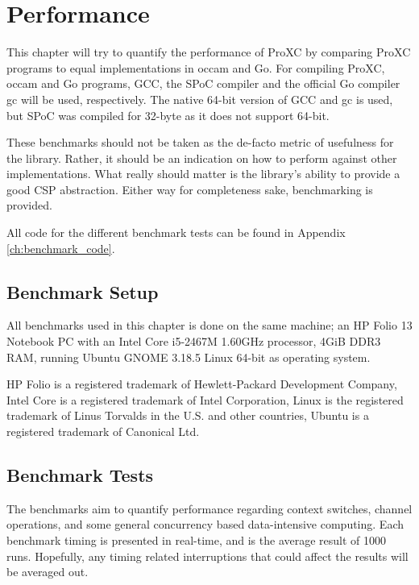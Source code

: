 
\chapter{Performance}
\label{ch:performance}

This chapter will try to quantify the performance of ProXC by comparing ProXC programs to equal implementations in occam and Go. For compiling ProXC, occam and Go programs, GCC, the SPoC compiler and the official Go compiler gc will be used, respectively. The native 64\hyp{}bit version of GCC and gc is used, but SPoC was compiled for 32\hyp{}byte as it does not support 64\hyp{}bit. 

These benchmarks should not be taken as the de\hyp{}facto metric of usefulness for the library. Rather, it should be an indication on how to perform against other implementations. What really should matter is the library's ability to provide a good CSP abstraction. Either way for completeness sake, benchmarking is provided. 

All code for the different benchmark tests can be found in Appendix \ref{ch:benchmark_code}. 

\section{Benchmark Setup}

All benchmarks used in this chapter is done on the same machine; an HP\textregistered{} Folio 13 Notebook PC with an Intel\textregistered{} Core\texttrademark{} i5-2467M 1.60GHz processor, 4GiB DDR3 RAM, running Ubuntu GNOME 3.18.5 Linux\textregistered{} 64-bit as operating system.

HP Folio is a registered trademark of Hewlett\hyp{}Packard Development Company, Intel Core is a registered trademark of Intel Corporation, Linux is the registered trademark of Linus Torvalds in the U.S. and other countries, Ubuntu is a registered trademark of Canonical Ltd.

\section{Benchmark Tests}

The benchmarks aim to quantify performance regarding context switches, channel operations, and some general concurrency based data\hyp{}intensive computing. Each benchmark timing is presented in real\hyp{}time, and is the average result of 1000 runs. Hopefully, any timing related interruptions that could affect the results will be averaged out. 

